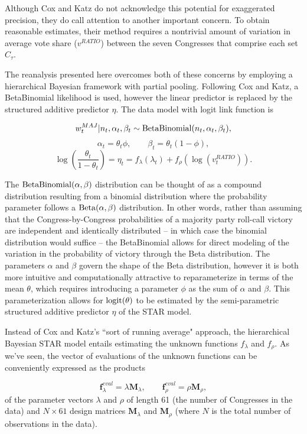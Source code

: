 Although Cox and Katz do not acknowledge this potential for exaggerated precision, they do call attention to another important concern. To obtain reasonable estimates, their method requires a nontrivial amount of variation in average vote share ($v^{RATIO}$) between the seven Congresses that comprise each set $C_\tau$. 

The reanalysis presented here overcomes both of these concerns by employing a hierarchical Bayesian framework with partial pooling. Following Cox and Katz, a BetaBinomial likelihood is used, however the linear predictor is replaced by the structured additive predictor $\eta$. The data model with logit link function is 

$$w_t^{MAJ} | n_t, \alpha_t, \beta_t \sim {\rm BetaBinomial}(n_t, \alpha_t, \beta_t),$$
$$ \alpha_t = \theta_t \phi, \qquad \beta_t = \theta_t (1 - \phi),$$
$$ \log\left({\frac{\theta_t}{1 - \theta_t}}\right) = \eta_t = f_{\lambda}(\lambda_t) + f_\rho \left(\log{(v_t^{RATIO})}\right).$$

The ${\rm BetaBinomial}(\alpha,\beta)$ distribution can be thought of as a compound distribution resulting from a binomial distribution where the probability parameter follows a ${\rm Beta}(\alpha,\beta)$ distribution. In other words, rather than assuming that the Congress-by-Congress probabilities of a majority party roll-call victory are independent and identically distributed -- in which case the binomial distribution would suffice -- the BetaBinomial  allows for direct modeling of the variation in the probability of victory through the Beta distribution. The parameters $\alpha$ and $\beta$ govern the shape of the Beta distribution, however it is both more intuitive and computationally attractive to reparameterize in terms of the mean $\theta$, which requires introducing a parameter $\phi$ as the sum of $\alpha$ and $\beta$.  This parameterization allows for ${\rm logit}(\theta)$ to be estimated by the semi-parametric structured additive predictor $\eta$ of the STAR model. 

Instead of Cox and Katz's ``sort of running average" approach, the hierarchical Bayesian STAR model entails estimating the unknown functions $f_\lambda$ and $f_\rho$. As we've seen, the vector of evaluations of the unknown functions can be conveniently expressed as the products 

{\singlespacing
$$
\mathbf{f}^{eval}_\lambda = \lambda \mathbf{M}_\lambda, 
\qquad 
\mathbf{f}^{eval}_\rho = \rho \mathbf{M}_\rho, 
$$
}
%
\noindent of the parameter vectors $\lambda$ and $\rho$ of length 61 (the number of Congresses in the data) and  $N \times 61$ design matrices  $\mathbf{M}_\lambda$ and  $\mathbf{M}_\rho$ (where $N$ is the total number of observations in the data).   

